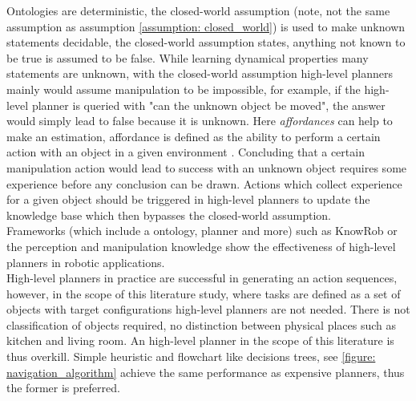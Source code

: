 Ontologies are deterministic, the closed-world assumption (note, not the same assumption as assumption \ref{assumption: closed_world}) is used to make unknown statements decidable, the closed-world assumption states, anything not known to be true is assumed to be false. While learning dynamical properties many statements are unknown, with the closed-world assumption high-level planners mainly would assume manipulation to be impossible, for example, if the high-level planner is queried with "can the unknown object be moved", the answer would simply lead to false because it is unknown. Here \textit{affordances} can help to make an estimation, affordance is defined as the ability to perform a certain action with an object in a given environment \cite{ardon_affordances_2020}. Concluding that a certain manipulation action would lead to success with an unknown object requires some experience before any conclusion can be drawn. Actions which collect experience for a given object should be triggered in high-level planners to update the knowledge base which then bypasses the closed-world assumption. \\

Frameworks (which include a ontology, planner and more) such as KnowRob \cite{beetz_know_2018} or the perception and manipulation knowledge  \cite{diab_pmkknowledge_2019} show the effectiveness of high-level planners in robotic applications. \\

High-level planners in practice are successful in generating an action sequences, however, in the scope of this literature study, where tasks are defined as a set of objects with target configurations high-level planners are not needed. There is not classification of objects required, no distinction between physical places such as kitchen and living room. An high-level planner in the scope of this literature is thus overkill. Simple heuristic and flowchart like decisions trees, see \cref{figure: navigation_algorithm} achieve the same performance as expensive planners, thus the former is preferred. 

